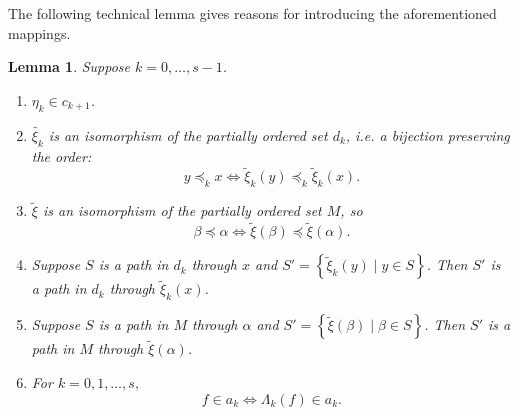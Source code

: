 \documentclass{asl}
\newtheorem{lemma}{Lemma}[section]
\theoremstyle{definition}
\begin{document}
The following technical lemma gives reasons for introducing the aforementioned mappings.

\begin{lemma}
Suppose $ k=0,\ldots,s-1 $.
\begin{enumerate}
\item $ \eta_{k}\in c_{k+1}$.
\medskip

\item $\tilde{\xi_{k}}$ is an isomorphism of the partially ordered set $d_{k} $, i.e. a bijection preserving the order:
\[y \preccurlyeq_k x\Leftrightarrow \tilde{\xi}_{k}(y) \preccurlyeq_k \tilde{\xi}_{k}(x).\]

\item $ \tilde{\xi} $  is an isomorphism of the partially ordered set $M$, so
\[\beta\preccurlyeq   \alpha\Leftrightarrow\tilde{\xi}(\beta) \preccurlyeq \tilde{\xi}(\alpha).\]

\item Suppose $ S $ is a path in $d_{k} $ through $ x $ and $ S'= \left\lbrace \tilde{\xi}_{k}(y) \mid y \in S \right\rbrace $. Then $ S' $ is a path in $ d_{k} $ through $ \tilde{\xi}_{k}(x) $.
\medskip

\item Suppose $ S $ is a path in $ M $ through $ \alpha $ and $ S'= \left\lbrace \tilde{\xi}(\beta) \mid \beta \in S \right\rbrace $. Then $ S' $ is a path in $ M$ through $ \tilde{\xi}(\alpha) $.
\medskip

\item For $ k=0, 1,\ldots,s, $
\[f \in a_{k}  \Leftrightarrow  \Lambda_{k}(f) \in a_{k}.\]
\end{enumerate}
\label{lemma:permutations}
\end{lemma}
\end{document}
